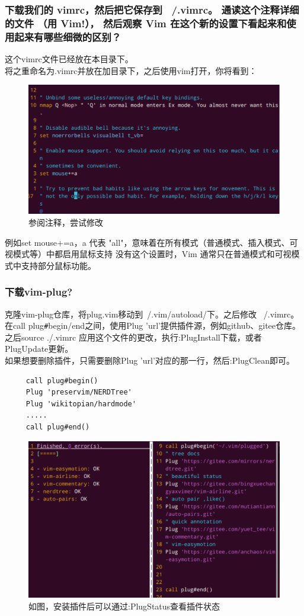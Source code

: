\documentclass[UTF8]{ctexart}
\begin{document}
\subsubsection{下载我们的 vimrc，然后把它保存到 ~/.vimrc。 通读这个注释详细的文件 （用 Vim!）， 然后观察 Vim 在这个新的设置下看起来和使用起来有哪些细微的区别？}
这个vimrc文件已经放在本目录下。\\
\indent 将之重命名为.vimrc并放在加目录下，之后使用vim打开，你将看到：\\
\begin{figure}[H]
	\centering
	\includegraphics[width=0.7\linewidth]{figures/look_vimrc.png}
	\caption{参阅注释，尝试修改}
\end{figure}
\indent 例如set mouse+=a，a 代表 "all"，意味着在所有模式（普通模式、插入模式、可视模式等）中都启用鼠标支持
没有这个设置时，Vim 通常只在普通模式和可视模式中支持部分鼠标功能。\\

\subsubsection{下载vim-plug?}
克隆vim-plug仓库，将plug.vim移动到~/.vim/autoload/下。之后修改 ~/.vimrc。\\
\indent 在call plug\verb|#|begin/end之间，使用Plug 'url'提供插件源，例如github、gitee仓库。之后source ./.vimrc
应用这个文件的更改，执行:PlugInstall下载，或者PlugUpdate更新。\\
\indent 如果想要删除插件，只需要删除Plug 'url'对应的那一行，然后:PlugClean即可。\\
\begin{lstlisting}
	 call plug#begin()
	 Plug 'preservim/NERDTree'
	 Plug 'wikitopian/hardmode'
	 .....
	 call plug#end()
\end{lstlisting}
\begin{figure}[H]
	\centering
	\includegraphics[width=0.7\linewidth]{figures/plug.png}
	\caption{如图，安装插件后可以通过:PlugStatus查看插件状态}
\end{figure}
\end{document}
